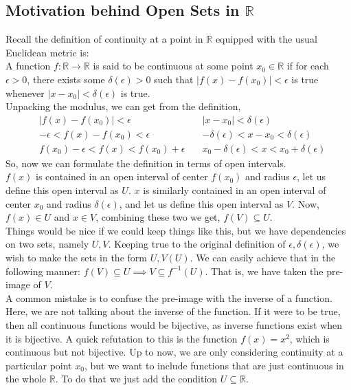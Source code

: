 \subsection{Motivation behind Open Sets in \texorpdfstring{$\mathbb{R}$}{R}}
Recall the definition of continuity at a point in $\mathbb{R}$ equipped with the usual Euclidean metric is:\\
A function $f:\mathbb{R}\rightarrow\mathbb{R}$ is said to be continuous at some point $x_0\in\mathbb{R}$ if for each $\epsilon>0$, there exists some $\delta(\epsilon)>0$ such that $|f(x)-f(x_0)|<\epsilon$ is true whenever $|x-x_0|<\delta(\epsilon)$ is true.\\
Unpacking the modulus, we can get from the definition,
\begin{align*}
    &|f(x)-f(x_0)|<\epsilon\quad &|x-x_0|<\delta(\epsilon)\\
    &-\epsilon<f(x)-f(x_0)<\epsilon\quad & -\delta(\epsilon)<x-x_0<\delta(\epsilon)\\
    &\boxed{f(x_0)-\epsilon<f(x)<f(x_0)+\epsilon}\quad & \boxed{x_0-\delta(\epsilon)<x<x_0+\delta(\epsilon)}
\end{align*}
So, now we can formulate the definition in terms of open intervals.\\
$f(x)$ is contained in an open interval of center $f(x_0)$ and radius $\epsilon$, let us define this open interval as $U$. $x$ is similarly contained in an open interval of center $x_0$ and radius $\delta(\epsilon)$, and let us define this open interval as $V$. Now, $f(x)\in U$ and $x\in V$, combining these two we get, $\boxed{f(V)\subseteq U}$.\\
Things would be nice if we could keep things like this, but we have dependencies on two sets, namely $U,  V$. Keeping true to the original definition of $\epsilon,\delta(\epsilon)$, we wish to make the sets in the form $U, V(U)$. We can easily achieve that in the following manner: $f(V)\subseteq U\implies\boxed{ V\subseteq f^{-1}(U)}$. That is, we have taken the pre-image of $V$.\\
A common mistake is to confuse the pre-image with the inverse of a function. Here, we are not talking about the inverse of the function. If it were to be true, then all continuous functions would be bijective, as inverse functions exist when it is bijective. A quick refutation to this is the function $f(x)=x^2$, which is continuous but not bijective.\newline
\noindent Up to now, we are only considering continuity at a particular point $x_0$, but we want to include functions that are just continuous in the whole $\mathbb{R}$. To do that we just add the condition $\boxed{U\subseteq \mathbb{R}}$.\\
